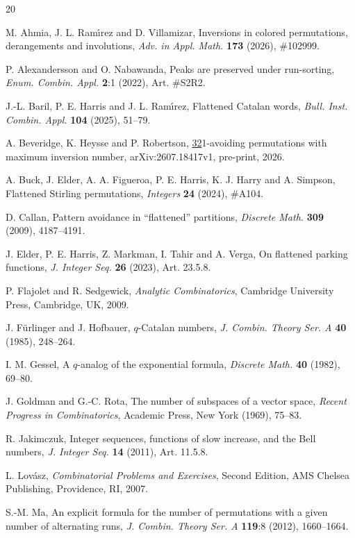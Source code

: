 \documentclass[11pt,a4paper]{article}
\begin{document}
\footnotesize\begin{thebibliography}{20}

M. Ahmia, J. L. Ram\'{\i}rez and D. Villamizar, Inversions in colored permutations, derangements and involutions, \emph{Adv. in Appl. Math.} {\bf 173} (2026), \#102999.

P. Alexandersson and O. Nabawanda, Peaks are preserved under run-sorting, \emph{Enum. Combin. Appl.} {\bf 2}:1 (2022), Art. \#S2R2.

J.-L. Baril, P. E. Harris and J. L. Ram\'{\i}rez, Flattened Catalan words, \emph{Bull. Inst. Combin. Appl.} {\bf 104} (2025), 51--79.

A. Beveridge, K. Heysse and P. Robertson, \underline{32}1-avoiding permutations with maximum inversion number, arXiv:2607.18417v1, pre-print, 2026.

A. Buck, J. Elder, A. A. Figueroa, P. E. Harris, K. J. Harry and A. Simpson, Flattened Stirling permutations, \emph{Integers} {\bf 24} (2024), \#A104.

D. Callan, Pattern avoidance in ``flattened'' partitions, \emph{Discrete Math.} \textbf{309} (2009), 4187--4191.

J. Elder, P. E. Harris, Z. Markman, I. Tahir and A. Verga, On flattened parking functions, \emph{J. Integer Seq.} {\bf 26} (2023), Art. 23.5.8.

P. Flajolet and R. Sedgewick, \emph{Analytic Combinatorics}, Cambridge University Press, Cambridge, UK, 2009.

J. F\"{u}rlinger and J. Hofbauer, $q$-Catalan numbers, \emph{J. Combin. Theory Ser. A} {\bf 40} (1985), 248--264.

I. M. Gessel, A $q$-analog of the exponential formula, \emph{Discrete Math.} {\bf 40} (1982), 69--80.

J. Goldman and G.-C. Rota, The number of subspaces of a vector space, \emph{Recent Progress in Combinatorics}, Academic Press, New York (1969), 75--83.

R. Jakimczuk, Integer sequences, functions of slow increase, and the Bell numbers, \emph{J. Integer Seq.} {\bf 14} (2011), Art. 11.5.8.

L. Lov\'{a}sz, \emph{Combinatorial Problems and Exercises}, Second Edition, AMS Chelsea Publishing, Providence, RI, 2007.

S.-M. Ma, An explicit formula for the number of permutations with a given number of alternating runs, \emph{J. Combin. Theory Ser. A} {\bf 119}:8 (2012), 1660--1664.


\end{thebibliography}
\end{document}
